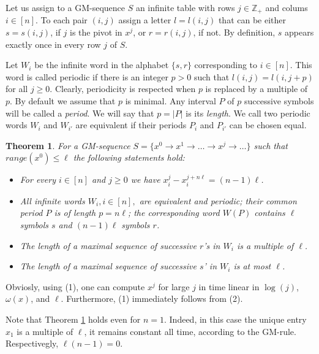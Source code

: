 \documentclass[10pt]{article}
\newtheorem{theorem}{Theorem}
\theoremstyle{definition}
\def\ZZ{\mathbb{Z}}
\begin{document}
Let us assign to a GM-sequence $S$  an infinite table 
with rows $j \in \ZZ_+$  and colums $i \in [n]$. 
To each pair $(i,j)$  assign a letter $l = l(i,j)$ 
that can be either $s = s(i,j)$,     
if  $j$  is the pivot in $x^j$,    
or $r = r(i,j)$, if not. 
By definition, $s$  appears exactly once 
in every row  $j$ of $S$. 

Let  $W_i$  be the infinite word 
in the alphabet $\{s,r\}$  corresponding to $i \in [n]$. 
This word is called periodic if there is 
an integer $p > 0$  such that 
$l(i,j) = l(i, j + p)$  for all  $j \geq 0$. 
Clearly, periodicity is respected 
when $p$  is replaced by a multiple of $p$. 
By default we assume that  $p$  is minimal.  
Any interval $P$  of $p$  successive symbols 
will be called a {\em period}. 
We will say that $p = |P|$ is its {\em length}.   
We call two periodic words  $W_i$  and $W_{i'}$  
are equivalent if their periods 
$P_i$  and $P_{i'}$  can be chosen equal.

\begin{theorem} 
\label{t-main} 
For a GM-sequence 
$S = \{x^0 \to x^1 \to \ldots \to x^j \to \ldots\}$ 
such that $range(x^0) \leq \ell$ 
the following statements hold: 

\begin{itemize} 
\item[(1)] 
For every $i \in [n]$ and $j \geq 0$ we have 
$x_i^j -x_i^{j + n \ell} = (n-1) \ell$. 
\item[(2)]  
All infinite words $W_i, i \in [n],$  are equivalent and periodic; 
their common period  $P$  is of length $p = n \ell$;
the corresponding word $W(P)$ 
contains  $\ell$  symbols $s$  and  $(n-1) \ell$  symbols  $r$. 
\item[(3)]  
The length of a maximal sequence of successive $r$'s in $W_i$ 
is a multiple of  $\ell$. 
\item[(4)] 
The length of a maximal sequence of successive $s$' in $W_i$  
is at most $\ell$. 
\end{itemize} 
\end{theorem} 

Obviosly, using (1), one can compute 
$x^j$  for large  $j$ in time 
linear in  $\log(j)$, $\omega(x)$, and $\ell$.   
Furthermore, (1) immediately follows from (2). 

Note that Theorem \ref{t-main} holds even for $n = 1$.  
Indeed, in this case the unique entry $x_1$  is a multiple of $\ell$, 
it remains constant all time, according to the GM-rule.  
Respectivegly,  $\ell (n-1) = 0$. 
\end{document}
